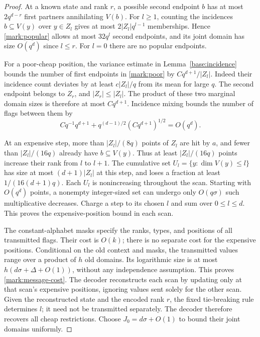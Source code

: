 \begin{proof}
At a known state and rank $r$, a possible second endpoint $b$ has at
most $2q^{d-r}$ first partners annihilating $V(b)$. For $l\ge1$, counting
the incidences $b\subseteq V(y)$ over $y\in Z_l$ gives at most
$2|Z_l|q^{l-1}$ memberships. Hence \eqref{mark:popular} allows at most
$32q^l$ second endpoints, and its joint domain has size $O(q^d)$ since
$l\le r$. For $l=0$ there are no popular endpoints.

For a poor-cheap position, the variance estimate in
Lemma~\ref{base:incidence} bounds the number of first endpoints in
\eqref{mark:poor} by $Cq^{d+1}/|Z_l|$. Indeed their incidence count
deviates by at least $c|Z_l|/q$ from its mean for large $q$.
The second endpoint belongs to $Z_r$, and $|Z_r|\le|Z_l|$.
The product of these two marginal domain sizes is therefore at most
$Cq^{d+1}$. Incidence mixing bounds the number of flags between them by
\[
 Cq^{-1}q^{d+1}
       +q^{(d-1)/2}(Cq^{d+1})^{1/2}=O(q^d).
\]

At an expensive step, more than $|Z_l|/(8q)$ points of $Z_l$ are hit
by $a$, and fewer than $|Z_l|/(16q)$ already have $b\subseteq V(y)$.
Thus at least $|Z_l|/(16q)$ points increase their rank from $l$ to
$l+1$. The cumulative set
$U_l=\{y:\dim V(y)\le l\}$ has size at most $(d+1)|Z_l|$ at this
step, and loses a fraction at least $1/(16(d+1)q)$. Each $U_l$ is
nonincreasing throughout the scan. Starting with $O(q^d)$ points, a
nonempty integer-sized set can undergo only $O(q\sigma)$ such
multiplicative decreases. Charge a step to its chosen $l$ and sum over
$0\le l\le d$. This proves the expensive-position bound in each scan.

The constant-alphabet masks specify the ranks, types, and positions of
all transmitted flags. Their cost is $O(k)$; there is no separate cost
for the expensive positions. Conditional on the old context and masks,
the transmitted values range over a product of $h$ old domains.
Its logarithmic size is at most $h(d\sigma+\Delta+O(1))$, without any
independence assumption. This proves \eqref{mark:message-cost}.
The decoder reconstructs each scan by updating only at that scan's
expensive positions, ignoring values sent solely for the other scan.
Given the reconstructed state and the encoded rank $r$, the fixed
tie-breaking rule determines $l$; it need not be transmitted separately.
The decoder therefore recovers all cheap restrictions.
Choose $J_0=d\sigma+O(1)$ to bound their joint domains uniformly.


\end{proof}
